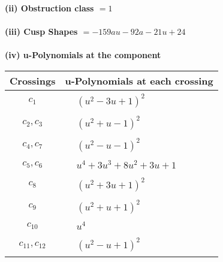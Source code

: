 \documentclass[1p]{elsarticle_modified}
\theoremstyle{definition}
\begin{document}
\flushleft \textbf{(ii) Obstruction class $= 1$}\\~\\
\flushleft \textbf{(iii) Cusp Shapes $= -159 a u-92 a-21 u+24$}\\~\\
\newpage\renewcommand{\arraystretch}{1}
\flushleft \textbf{(iv) u-Polynomials at the component}\newline \\
\begin{tabular}{m{50pt}|m{274pt}}
Crossings & \hspace{64pt}u-Polynomials at each crossing \\
\hline $$\begin{aligned}c_{1}\end{aligned}$$&$\begin{aligned}
&(u^2-3 u+1)^2
\end{aligned}$\\
\hline $$\begin{aligned}c_{2},c_{3}\end{aligned}$$&$\begin{aligned}
&(u^2+u-1)^2
\end{aligned}$\\
\hline $$\begin{aligned}c_{4},c_{7}\end{aligned}$$&$\begin{aligned}
&(u^2- u-1)^2
\end{aligned}$\\
\hline $$\begin{aligned}c_{5},c_{6}\end{aligned}$$&$\begin{aligned}
&u^4+3 u^3+8 u^2+3 u+1
\end{aligned}$\\
\hline $$\begin{aligned}c_{8}\end{aligned}$$&$\begin{aligned}
&(u^2+3 u+1)^2
\end{aligned}$\\
\hline $$\begin{aligned}c_{9}\end{aligned}$$&$\begin{aligned}
&(u^2+u+1)^2
\end{aligned}$\\
\hline $$\begin{aligned}c_{10}\end{aligned}$$&$\begin{aligned}
&u^4
\end{aligned}$\\
\hline $$\begin{aligned}c_{11},c_{12}\end{aligned}$$&$\begin{aligned}
&(u^2- u+1)^2
\end{aligned}$\\
\hline
\end{tabular}\\~\\
\end{document}
